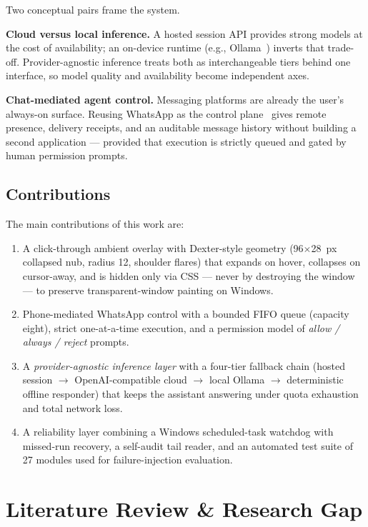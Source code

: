 \documentclass[conference]{IEEEtran}
\begin{document}
Two conceptual pairs frame the system.

\textbf{Cloud versus local inference.} A hosted session API
provides strong models at the cost of availability; an on-device
runtime (e.g., Ollama~\cite{ollama}) inverts that trade-off.
Provider-agnostic inference treats both as interchangeable tiers
behind one interface, so model quality and availability become
independent axes.

\textbf{Chat-mediated agent control.} Messaging platforms are
already the user's always-on surface. Reusing WhatsApp as the
control plane~\cite{whatsapp} gives remote presence, delivery
receipts, and an auditable message history without building a
second application --- provided that execution is strictly queued
and gated by human permission prompts.

\subsection{Contributions}

The main contributions of this work are:

\begin{enumerate}
  \item A click-through ambient overlay with Dexter-style
  geometry (96$\times$28~px collapsed nub, radius 12, shoulder
  flares) that expands on hover, collapses on cursor-away, and is
  hidden only via CSS --- never by destroying the window --- to
  preserve transparent-window painting on Windows.
  \item Phone-mediated WhatsApp control with a bounded FIFO queue
  (capacity eight), strict one-at-a-time execution, and a
  permission model of \emph{allow / always / reject} prompts.
  \item A \emph{provider-agnostic inference layer} with a
  four-tier fallback chain (hosted session $\rightarrow$
  OpenAI-compatible cloud $\rightarrow$ local Ollama
  $\rightarrow$ deterministic offline responder) that keeps the
  assistant answering under quota exhaustion and total network
  loss.
  \item A reliability layer combining a Windows scheduled-task
  watchdog with missed-run recovery, a self-audit tail reader,
  and an automated test suite of 27 modules used for
  failure-injection evaluation.
\end{enumerate}

\section{Literature Review \& Research Gap}
\end{document}
